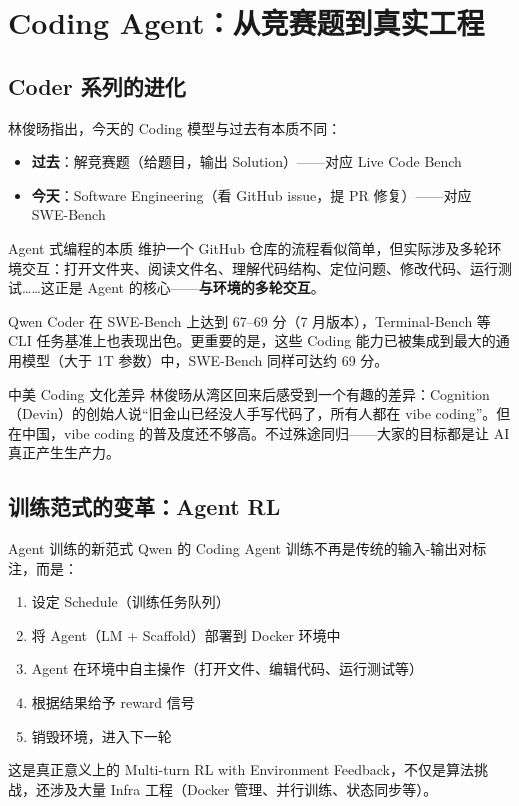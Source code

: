 \section{Coding Agent：从竞赛题到真实工程}

\subsection{Coder 系列的进化}

林俊旸指出，今天的 Coding 模型与过去有本质不同：

\begin{itemize}
    \item \textbf{过去}：解竞赛题（给题目，输出 Solution）——对应 Live Code Bench
    \item \textbf{今天}：Software Engineering（看 GitHub issue，提 PR 修复）——对应 SWE-Bench
\end{itemize}

\begin{importantbox}{Agent 式编程的本质}
维护一个 GitHub 仓库的流程看似简单，但实际涉及多轮环境交互：打开文件夹、阅读文件名、理解代码结构、定位问题、修改代码、运行测试……这正是 Agent 的核心——\textbf{与环境的多轮交互}。
\end{importantbox}

Qwen Coder 在 SWE-Bench 上达到 67--69 分（7 月版本），Terminal-Bench 等 CLI 任务基准上也表现出色。更重要的是，这些 Coding 能力已被集成到最大的通用模型（大于 1T 参数）中，SWE-Bench 同样可达约 69 分。

\begin{knowledgebox}{中美 Coding 文化差异}
林俊旸从湾区回来后感受到一个有趣的差异：Cognition（Devin）的创始人说``旧金山已经没人手写代码了，所有人都在 vibe coding''。但在中国，vibe coding 的普及度还不够高。不过殊途同归——大家的目标都是让 AI 真正产生生产力。
\end{knowledgebox}

\subsection{训练范式的变革：Agent RL}

\begin{importantbox}{Agent 训练的新范式}
Qwen 的 Coding Agent 训练不再是传统的输入-输出对标注，而是：
\begin{enumerate}
    \item 设定 Schedule（训练任务队列）
    \item 将 Agent（LM + Scaffold）部署到 Docker 环境中
    \item Agent 在环境中自主操作（打开文件、编辑代码、运行测试等）
    \item 根据结果给予 reward 信号
    \item 销毁环境，进入下一轮
\end{enumerate}
这是真正意义上的 Multi-turn RL with Environment Feedback，不仅是算法挑战，还涉及大量 Infra 工程（Docker 管理、并行训练、状态同步等）。
\end{importantbox}

